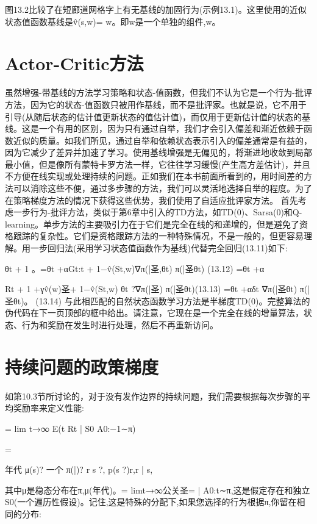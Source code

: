 图13.2比较了在短廊道网格字上有无基线的加固行为(示例13.1)。这里使用的近似状态值函数基线是v̂(s,w)= w。即w是一个单独的组件,w。


\section{Actor-Critic方法}

虽然增强-带基线的方法学习策略和状态-值函数，但我们不认为它是一个行为-批评方法，因为它的状态-值函数只被用作基线，而不是批评家。也就是说，它不用于引导(从随后状态的估计值更新状态的值估计值)，而仅用于更新估计值的状态的基线。这是一个有用的区别，因为只有通过自举，我们才会引入偏差和渐近依赖于函数近似的质量。如我们所见，通过自举和依赖状态表示引入的偏差通常是有益的，因为它减少了差异并加速了学习。使用基线增强是无偏见的，将渐进地收敛到局部最小值，但是像所有蒙特卡罗方法一样，它往往学习缓慢(产生高方差估计)，并且不方便在线实现或处理持续的问题。正如我们在本书前面所看到的，用时间差的方法可以消除这些不便，通过多步骤的方法，我们可以灵活地选择自举的程度。为了在策略梯度方法的情况下获得这些优势，我们使用了自适应批评家方法。
首先考虑一步行为-批评方法，类似于第6章中引入的TD方法，如TD(0)、Sarsa(0)和Q-learning。单步方法的主要吸引力在于它们是完全在线的和递增的，但是避免了资格跟踪的复杂性。它们是资格跟踪方法的一种特殊情况，不是一般的，但更容易理解。用一步回归法(采用学习状态值函数作为基线)代替完全回归(13.11)如下:

θt + 1
。=θt +αGt:t + 1−v̂(St,w)∇π(|圣,θt)
π(|圣θt) 					(13.12)
=θt +α

Rt + 1 +γv̂(w)圣+ 1−v̂(St,w)
θt ?∇π(|圣)
π(|圣θt)(13.13)
=θt +αδt
∇π(|圣θt)
π(|圣θt)。 					(13.14)
与此相匹配的自然状态函数学习方法是半梯度TD(0)。完整算法的伪代码在下一页顶部的框中给出。请注意，它现在是一个完全在线的增量算法，状态、行为和奖励在发生时进行处理，然后不再重新访问。

\section{持续问题的政策梯度}

如第10.3节所讨论的，对于没有发作边界的持续问题，我们需要根据每次步骤的平均奖励率来定义性能:
 
= lim
t→∞
E(t Rt | S0 A0:−1∼π)

=

年代
μ(s)?
一个
π(|)?
r s ?,
p(s ?)r,r | s,


其中μ是稳态分布在π,μ(年代)。= limt→∞公关{圣= | A0:t∼π},这是假定存在和独立S0(一个遍历性假设)。记住,这是特殊的分配下,如果您选择的行为根据π,你留在相同的分布:

